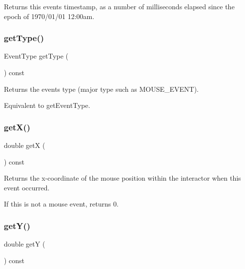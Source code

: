Returns this event\textquotesingle{}s timestamp, as a number of milliseconds elapsed since the epoch of 1970/01/01 12\+:00am. 

\mbox{\label{classGEvent_adfcd587f82f4340eaef5404f2cf6795c}} 
\subsubsection{\texorpdfstring{get\+Type()}{getType()}}
{\footnotesize\ttfamily Event\+Type get\+Type (\begin{DoxyParamCaption}{ }\end{DoxyParamCaption}) const\hspace{0.3cm}{\ttfamily [virtual]}}



Returns the event\textquotesingle{}s type (major type such as M\+O\+U\+S\+E\+\_\+\+E\+V\+E\+NT). 

Equivalent to get\+Event\+Type. \mbox{\label{classGEvent_a344385751bee0720059403940d57a13e}} 
\subsubsection{\texorpdfstring{get\+X()}{getX()}}
{\footnotesize\ttfamily double getX (\begin{DoxyParamCaption}{ }\end{DoxyParamCaption}) const\hspace{0.3cm}{\ttfamily [virtual]}}



Returns the x-\/coordinate of the mouse position within the interactor when this event occurred. 

If this is not a mouse event, returns 0. \mbox{\label{classGEvent_aafa51c7f8f38a09febbb9ce7853f77b4}} 
\subsubsection{\texorpdfstring{get\+Y()}{getY()}}
{\footnotesize\ttfamily double getY (\begin{DoxyParamCaption}{ }\end{DoxyParamCaption}) const\hspace{0.3cm}{\ttfamily [virtual]}}



